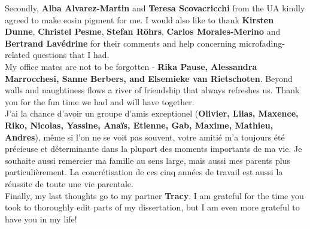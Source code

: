 Secondly, \textbf{Alba Alvarez-Martin} and \textbf{Teresa Scovacricchi} from the \gls{UA} kindly agreed to make eosin pigment for me. I would also like to thank \textbf{Kirsten Dunne}, \textbf{Christel Pesme}, \textbf{Stefan R\"{o}hrs}, \textbf{Carlos Morales-Merino} and \textbf{Bertrand Lavédrine} for their comments and help concerning microfading-related questions that I had. \\

My office mates are not to be forgotten - \textbf{Rika Pause, Alessandra Marrocchesi, Sanne Berbers, and Elsemieke van Rietschoten}. Beyond walls and naughtiness flows a river of friendship that always refreshes us. Thank you for the fun time we had and will have together.\\

J'ai la chance d'avoir un groupe d'amis exceptionel (\textbf{Olivier, Lilas, Maxence, Riko, Nicolas, Yassine, Anaïs, Etienne, Gab, Maxime, Mathieu, Andres}), même si l'on ne se voit pas souvent, votre amitié m'a toujours été précieuse et déterminante dans la plupart des moments importants de ma vie. Je souhaite aussi remercier ma famille au sens large, mais aussi mes parents plus particulièrement. La concrétisation de ces cinq années de travail est aussi la réussite de toute une vie parentale. \\

Finally, my last thoughts go to my partner \textbf{Tracy}. I am grateful for the time you took to thoroughly edit parts of my dissertation, but I am even more grateful to have you in my life!